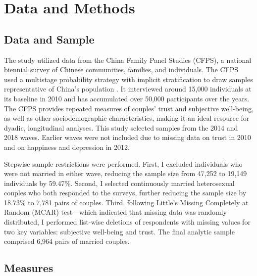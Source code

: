 \section{Data and Methods}
\label{sec:ch4-data-methods}

\subsection{Data and Sample}

The study utilized data from the China Family Panel Studies (CFPS), a national biennial survey of Chinese communities, families, and individuals. The CFPS used a multistage probability strategy with implicit stratification to draw samples representative of China’s population \parencite{xieSamplingDesignChina2015}. It interviewed around 15,000 individuals at its baseline in 2010 and has accumulated over 50,000 participants over the years. The CFPS provides repeated measures of couples' trust and subjective well-being, as well as other sociodemographic characteristics, making it an ideal resource for dyadic, longitudinal analyses. This study selected samples from the 2014 and 2018 waves. Earlier waves were not included due to missing data on trust in 2010 and on happiness and depression in 2012.

Stepwise sample restrictions were performed. First, I excluded individuals who were not married in either wave, reducing the sample size from 47,252 to 19,149 individuals by 59.47\%. Second, I selected continuously married heterosexual couples who both responded to the surveys, further reducing the sample size by 18.73\% to 7,781 pairs of couples. Third, following Little's Missing Completely at Random (MCAR) test—which indicated that missing data was randomly distributed, I performed list-wise deletions of respondents with missing values for two key variables: subjective well-being and trust. The final analytic sample comprised 6,964 pairs of married couples.

\subsection{Measures}


